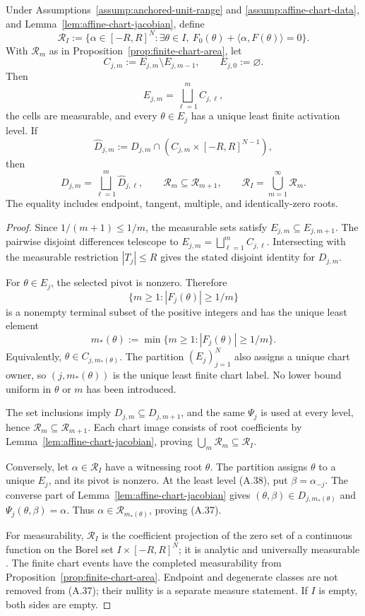 \begin{lemma}
\label{lem:affine-exhaustion}
Under Assumptions~\ref{assump:anchored-unit-range} and
\ref{assump:affine-chart-data}, and
Lemma~\ref{lem:affine-chart-jacobian}, define
\[
\mathcal R_I:=\{\alpha\in[-R,R]^N:\exists\theta\in I,
 \ F_0(\theta)+\langle\alpha,F(\theta)\rangle=0\}.
\]
With $\mathcal R_m$ as in Proposition~\ref{prop:finite-chart-area}, let
\[
C_{j,m}:=E_{j,m}\setminus E_{j,m-1},
\qquad E_{j,0}:=\varnothing.
\]
Then
\[
E_{j,m}=\bigsqcup_{\ell=1}^m C_{j,\ell},
\]
the cells are measurable, and every $\theta\in E_j$ has a unique least
finite activation level.  If
\[
\widehat D_{j,m}:=D_{j,m}\cap
 (C_{j,m}\times[-R,R]^{N-1}),
\]
then
\[
D_{j,m}=\bigsqcup_{\ell=1}^m\widehat D_{j,\ell},
\qquad
\mathcal R_m\subseteq\mathcal R_{m+1},
\qquad
\mathcal R_I=\bigcup_{m=1}^\infty\mathcal R_m.
\tag{A.37}
\]
The equality includes endpoint, tangent, multiple, and identically-zero
roots.
\end{lemma}

\begin{proof}
Since $1/(m+1)\leq1/m$, the measurable sets satisfy
$E_{j,m}\subseteq E_{j,m+1}$.  The pairwise disjoint differences telescope
to $E_{j,m}=\bigsqcup_{\ell=1}^m C_{j,\ell}$.  Intersecting with the
measurable restriction $|T_j|\leq R$ gives the stated disjoint identity for
$D_{j,m}$.

For $\theta\in E_j$, the selected pivot is nonzero.  Therefore
\[
\{m\geq1:|F_j(\theta)|\geq1/m\}
\]
is a nonempty terminal subset of the positive integers and has the unique
least element
\[
m_*(\theta):=\min\{m\geq1:|F_j(\theta)|\geq1/m\}.
\tag{A.38}
\]
Equivalently, $\theta\in C_{j,m_*(\theta)}$.  The partition
$(E_j)_{j=1}^N$ also assigns a unique chart owner, so $(j,m_*(\theta))$ is
the unique least finite chart label.  No lower bound uniform in $\theta$ or
$m$ has been introduced.

The set inclusions imply $D_{j,m}\subseteq D_{j,m+1}$, and the same
$\Psi_j$ is used at every level, hence
$\mathcal R_m\subseteq\mathcal R_{m+1}$.  Each chart image consists of root
coefficients by Lemma~\ref{lem:affine-chart-jacobian}, proving
$\bigcup_m\mathcal R_m\subseteq\mathcal R_I$.

Conversely, let $\alpha\in\mathcal R_I$ have a witnessing root $\theta$.
The partition assigns $\theta$ to a unique $E_j$, and its pivot is nonzero.
At the least level (A.38), put $\beta=\alpha_{-j}$.  The converse part of
Lemma~\ref{lem:affine-chart-jacobian} gives
$(\theta,\beta)\in D_{j,m_*(\theta)}$ and
$\Psi_j(\theta,\beta)=\alpha$.  Thus
$\alpha\in\mathcal R_{m_*(\theta)}$, proving (A.37).

For measurability, $\mathcal R_I$ is the coefficient projection of the zero
set of a continuous function on the Borel set
$I\times[-R,R]^N$; it is analytic and universally measurable
\citep{bogachev2007measure}.  The finite chart events have the completed
measurability from Proposition~\ref{prop:finite-chart-area}.  Endpoint and
degenerate classes are not removed from (A.37); their nullity is a separate
measure statement.  If $I$ is empty, both sides are empty.
\end{proof}

